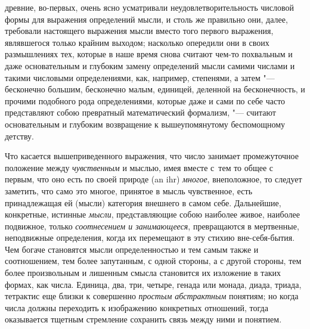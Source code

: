 древние, во-первых, очень ясно усматривали неудовлетворительность числовой
формы для выражения определений мысли, и столь же правильно они, далее,
требовали настоящего выражения мысли вместо того первого выражения, являвшегося
только крайним выходом; насколько опередили они в своих размышлениях тех,
которые в наше время снова считают чем-то похвальным и даже основательным и
глубоким замену определений мысли самими числами и такими числовыми
определениями, как, например, степенями, а затем "--- бесконечно большим,
бесконечно малым, единицей, деленной на бесконечность, и прочими подобного рода
определениями, которые даже и сами по себе часто представляют собою
превратный математический формализм, "--- считают основательным и глубоким
возвращение к вышеупомянутому беспомощному детству.

Что касается вышеприведенного выражения, что число занимает промежуточное
положение между {\em чувственным} и мыслью, имея вместе с~тем то общее с
первым, что оно есть по своей природе (an ihr) {\em многое}, внеположное, то
следует заметить, что само это многое, принятое в мысль чувственное, есть
принадлежащая ей (мысли) категория внешнего в самом себе. Дальнейшие,
конкретные, истинные {\em мысли}, представляющие собою наиболее живое, наиболее
подвижное, только {\em соотнесением и занимающееся}, превращаются в мертвенные,
неподвижные определения, когда их перемещают в эту стихию вне-себя-бытия. Чем
богаче становятся мысли определенностью и тем самым также и соотношением, тем
более запутанным, с одной стороны, а с другой стороны, тем более произвольным и
лишенным смысла становится их изложение в таких формах, как числа. Единица,
два, три, четыре, генада или монада, диада, триада, тетрактис еще близки к
совершенно {\em простым абстрактным} понятиям; но когда числа должны
переходить к изображению конкретных отношений, тогда оказывается тщетным
стремление сохранить связь между ними и понятием.

